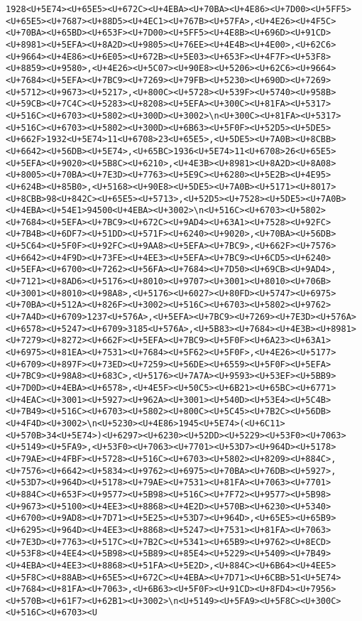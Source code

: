 \documentclass[
]{article}
\begin{document}
\begin{verbatim}
1928<U+5E74><U+65E5><U+672C><U+4EBA><U+70BA><U+4E86><U+7D00><U+5FF5><U+65E5><U+7687><U+88D5><U+4EC1><U+767B><U+57FA>,<U+4E26><U+4F5C><U+70BA><U+65BD><U+653F><U+7D00><U+5FF5><U+4E8B><U+696D><U+91CD><U+8981><U+5EFA><U+8A2D><U+9805><U+76EE><U+4E4B><U+4E00>,<U+62C6><U+9664><U+4E86><U+6E05><U+672B><U+5E03><U+653F><U+4F7F><U+53F8><U+8859><U+9580>,<U+4E26><U+5C07><U+90E8><U+5206><U+62C6><U+9664><U+7684><U+5EFA><U+7BC9><U+7269><U+79FB><U+5230><U+690D><U+7269><U+5712><U+9673><U+5217>,<U+800C><U+5728><U+539F><U+5740><U+958B><U+59CB><U+7C4C><U+5283><U+8208><U+5EFA><U+300C><U+81FA><U+5317><U+516C><U+6703><U+5802><U+300D><U+3002>\n<U+300C><U+81FA><U+5317><U+516C><U+6703><U+5802><U+300D><U+6B63><U+5F0F><U+52D5><U+5DE5><U+662F>1932<U+5E74>11<U+6708>23<U+65E5>,<U+5DE5><U+7A0B><U+8CBB><U+6642><U+56DB><U+5E74>,<U+65BC>1936<U+5E74>11<U+6708>26<U+65E5><U+5EFA><U+9020><U+5B8C><U+6210>,<U+4E3B><U+8981><U+8A2D><U+8A08><U+8005><U+70BA><U+7E3D><U+7763><U+5E9C><U+6280><U+5E2B><U+4E95><U+624B><U+85B0>,<U+5168><U+90E8><U+5DE5><U+7A0B><U+5171><U+8017><U+8CBB>98<U+842C><U+65E5><U+5713>,<U+52D5><U+7528><U+5DE5><U+7A0B><U+4EBA><U+54E1>94500<U+4EBA><U+3002>\n<U+516C><U+6703><U+5802><U+7684><U+5EFA><U+7BC9><U+672C><U+9AD4><U+63A1><U+7528><U+92FC><U+7B4B><U+6DF7><U+51DD><U+571F><U+6240><U+9020>,<U+70BA><U+56DB><U+5C64><U+5F0F><U+92FC><U+9AA8><U+5EFA><U+7BC9>,<U+662F><U+7576><U+6642><U+4F9D><U+73FE><U+4EE3><U+5EFA><U+7BC9><U+6CD5><U+6240><U+5EFA><U+6700><U+7262><U+56FA><U+7684><U+7D50><U+69CB><U+9AD4>,<U+7121><U+8AD6><U+5176><U+8010><U+9707><U+3001><U+8010><U+706B><U+3001><U+8010><U+98A8>,<U+5176><U+6027><U+80FD><U+5747><U+6975><U+70BA><U+512A><U+826F><U+3002><U+516C><U+6703><U+5802><U+9762><U+7A4D><U+6709>1237<U+576A>,<U+5EFA><U+7BC9><U+7269><U+7E3D><U+576A><U+6578><U+5247><U+6709>3185<U+576A>,<U+5B83><U+7684><U+4E3B><U+8981><U+7279><U+8272><U+662F><U+5EFA><U+7BC9><U+5F0F><U+6A23><U+63A1><U+6975><U+81EA><U+7531><U+7684><U+5F62><U+5F0F>,<U+4E26><U+5177><U+6709><U+897F><U+73ED><U+7259><U+56DE><U+6559><U+5F0F><U+5EFA><U+7BC9><U+98A8><U+683C>,<U+5176><U+7A7A><U+9593><U+53EF><U+5BB9><U+7D0D><U+4EBA><U+6578>,<U+4E5F><U+50C5><U+6B21><U+65BC><U+6771><U+4EAC><U+3001><U+5927><U+962A><U+3001><U+540D><U+53E4><U+5C4B><U+7B49><U+516C><U+6703><U+5802><U+800C><U+5C45><U+7B2C><U+56DB><U+4F4D><U+3002>\n<U+5230><U+4E86>1945<U+5E74>(<U+6C11><U+570B>34<U+5E74>)<U+6297><U+6230><U+52DD><U+5229><U+53F0><U+7063><U+5149><U+5FA9>,<U+53F0><U+7063><U+7701><U+53D7><U+964D><U+5178><U+79AE><U+4FBF><U+5728><U+516C><U+6703><U+5802><U+8209><U+884C>,<U+7576><U+6642><U+5834><U+9762><U+6975><U+70BA><U+76DB><U+5927>,<U+53D7><U+964D><U+5178><U+79AE><U+7531><U+81FA><U+7063><U+7701><U+884C><U+653F><U+9577><U+5B98><U+516C><U+7F72><U+9577><U+5B98><U+9673><U+5100><U+4EE3><U+8868><U+4E2D><U+570B><U+6230><U+5340><U+6700><U+9AD8><U+7D71><U+5E25><U+53D7><U+964D>,<U+65E5><U+65B9><U+6295><U+964D><U+4EE3><U+8868><U+5247><U+7531><U+81FA><U+7063><U+7E3D><U+7763><U+517C><U+7B2C><U+5341><U+65B9><U+9762><U+8ECD><U+53F8><U+4EE4><U+5B98><U+5B89><U+85E4><U+5229><U+5409><U+7B49><U+4EBA><U+4EE3><U+8868><U+51FA><U+5E2D>,<U+884C><U+6B64><U+4EE5><U+5F8C><U+88AB><U+65E5><U+672C><U+4EBA><U+7D71><U+6CBB>51<U+5E74><U+7684><U+81FA><U+7063>,<U+6B63><U+5F0F><U+91CD><U+8FD4><U+7956><U+570B><U+61F7><U+62B1><U+3002>\n<U+5149><U+5FA9><U+5F8C><U+300C><U+516C><U+6703><U
\end{verbatim}
\end{document}
